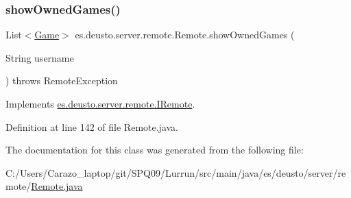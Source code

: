 \subsubsection{\texorpdfstring{show\+Owned\+Games()}{showOwnedGames()}}
{\footnotesize\ttfamily List$<$\hyperlink{classes_1_1deusto_1_1server_1_1db_1_1data_1_1_game}{Game}$>$ es.\+deusto.\+server.\+remote.\+Remote.\+show\+Owned\+Games (\begin{DoxyParamCaption}\item[{String}]{username }\end{DoxyParamCaption}) throws Remote\+Exception}



Implements \hyperlink{interfacees_1_1deusto_1_1server_1_1remote_1_1_i_remote_aaaf6af5906c81cbd7b3b190a70ead98b}{es.\+deusto.\+server.\+remote.\+I\+Remote}.



Definition at line 142 of file Remote.\+java.



The documentation for this class was generated from the following file\+:\begin{DoxyCompactItemize}
\item 
C\+:/\+Users/\+Carazo\+\_\+laptop/git/\+S\+P\+Q09/\+Lurrun/src/main/java/es/deusto/server/remote/\hyperlink{_remote_8java}{Remote.\+java}\end{DoxyCompactItemize}

